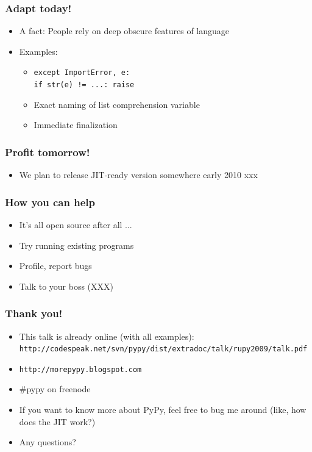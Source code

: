 \documentclass[utf8x]{beamer}
\begin{document}
\begin{frame}
  \frametitle{Adapt today!}
  \begin{itemize}
    \item A fact: People rely on deep obscure features of language
    \item Examples:
      \pause
      \begin{itemize}
        \item {\tt except ImportError, e: \\ \quad if str(e) != ...:
          raise}
          \pause
        \item Exact naming of list comprehension variable
          \pause
        \item Immediate finalization
      \end{itemize}
  \end{itemize}
\end{frame}

\begin{frame}
  \frametitle{Profit tomorrow!}
  \begin{itemize}
    \item We plan to release JIT-ready version somewhere early 2010
      xxx
  \end{itemize}
\end{frame}

\begin{frame}
  \frametitle{How you can help}
  \begin{itemize}
    \item It's all open source after all ...
    \item Try running existing programs
    \item Profile, report bugs
      \pause
    \item Talk to your boss (XXX)
  \end{itemize}
\end{frame}

\begin{frame}
  \frametitle{Thank you!}
  \begin{itemize}
    \item This talk is already online (with all examples):
      {\tt http://codespeak.net/svn/pypy/dist/extradoc/talk/rupy2009/talk.pdf}
    \item {\tt http://morepypy.blogspot.com}
    \item \#pypy on freenode
    \item If you want to know more about PyPy, feel free to bug me
      around (like, how does the JIT work?)
    \item Any questions?
  \end{itemize}
\end{frame}
\end{document}
